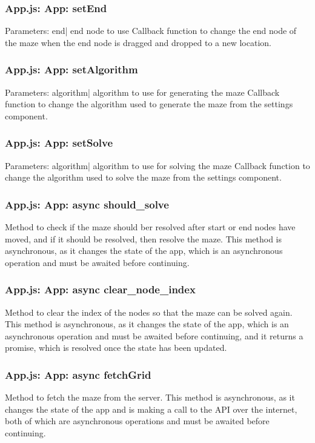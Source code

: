 \documentclass[titlepage]{article}
\begin{document}
\subsubsection{App.js: App: setEnd}
Parameters:\newline
\indent end| end node to use\newline
Callback function to change the end node of the maze when the end node is dragged and dropped to a new location.

\subsubsection{App.js: App: setAlgorithm}
Parameters:\newline
\indent algorithm| algorithm to use for generating the maze\newline
Callback function to change the algorithm used to generate the maze from the settings component.

\subsubsection{App.js: App: setSolve}
Parameters:\newline
\indent algorithm| algorithm to use for solving the maze\newline
Callback function to change the algorithm used to solve the maze from the settings component.

\subsubsection{App.js: App: async should\_solve}
Method to check if the maze should ber resolved after start or end nodes have moved, and if it should be resolved, then resolve the maze. This method is asynchronous, as it changes the state of the app, which is an asynchronous operation and must be awaited before continuing.

\subsubsection{App.js: App: async clear\_node\_index}
Method to clear the index of the nodes so that the maze can be solved again. This method is asynchronous, as it changes the state of the app, which is an asynchronous operation and must be awaited before continuing, and it returns a promise, which is resolved once the state has been updated.

\subsubsection{App.js: App: async fetchGrid}
Method to fetch the maze from the server. This method is asynchronous, as it changes the state of the app and is making a call to the API over the internet, both of which are asynchronous operations and must be awaited before continuing.
\end{document}
